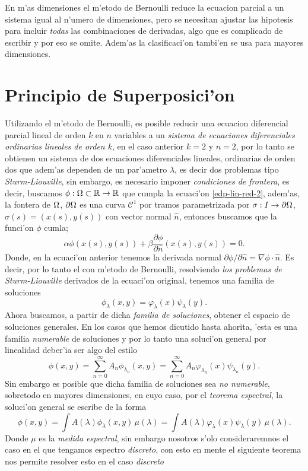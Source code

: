 \documentclass[main.tex]{subfiles}
\begin{document}
    \obs En m'as dimensiones el m'etodo de Bernoulli reduce la ecuacion parcial a un sistema igual al n'umero de dimensiones, pero se necesitan ajustar las hipotesis para incluir \emph{todas} las combinaciones de derivadas, algo que es complicado de escribir y por eso se omite. Adem'as la clasificaci'on tambi'en se usa para mayores dimensiones.
\section{Principio de Superposici'on}
\noindent Utilizando el m'etodo de Bernoulli, es posible reducir una ecuacion diferencial parcial lineal de orden $k$ en $n$ variables a un \emph{sistema de ecuaciones diferenciales ordinarias lineales de orden $k$}, en el caso anterior $k=2$ y $n=2$, por lo tanto se obtienen un sistema de dos ecuaciones diferenciales lineales, ordinarias de orden dos que adem'as dependen de un par'ametro $\lambda$, es decir dos problemas tipo \emph{Sturm-Liouville}, sin embargo, es necesario imponer \emph{condiciones de frontera}, es decir, buscamos $\phi:\Omega\subset\mathbb R \to\mathbb R $ que cumpla la ecuaci'on \ref{edp-lin-red-2}, adem'as, la fontera de $\Omega$, $\partial\Omega$ es una curva $\mathcal{C}^{1}$ por tramos parametrizada por $\sigma:I\to\partial\Omega$, $\sigma(s)=(x(s),y(s))$ con vector normal $\hat{n}$, entonces buscamos que la funci'on $\phi$ cumla;
\begin{equation}
  \alpha\phi(x(s),y(s))+\beta\dfrac{\partial\phi}{\partial \hat{n}}(x(s),y(s))=0.
\end{equation}
Donde, en la ecuaci'on anterior tenemos la derivada normal $\partial\phi/\partial\hat{n}=\nabla\phi\cdot\hat{n}$. Es decir, por lo tanto el con m'etodo de Bernoulli, resolviendo \emph{los problemas de Sturm-Liouville} derivados de la ecuaci'on original, tenemos una familia de soluciones
\[
  \phi_{\lambda}(x,y)=\varphi_{\lambda}(x)\psi_{\lambda}(y).
\]
Ahora buscamos, a partir de dicha \emph{familia de soluciones}, obtener el espacio de soluciones generales. En los casos que hemos dicutido hasta ahorita, 'esta es una familia \emph{numerable} de soluciones y por lo tanto una soluci'on general por linealidad deber'ia ser algo del estilo
\[
  \phi(x,y)=\sum_{n=0}^{\infty}A_{n}\phi_{\lambda_{n}}(x,y)=\sum_{n=0}^{\infty}A_{n}\varphi_{\lambda_{n}}(x)\psi_{\lambda_{n}}(y).
\]
Sin embargo es posible que dicha familia de soluciones sea \emph{no numerable}, sobretodo en mayores dimensiones, en cuyo caso, por el \emph{teorema espectral}, la soluci'on general se escribe de la forma
\[
  \phi(x,y)=\int A(\lambda)\phi_{\lambda}(x,y)\,\mu(\lambda)=\int A(\lambda)\varphi_{\lambda}(x)\psi_{\lambda}(y)\,\mu(\lambda).
\]
Donde $\mu$ es la \emph{medida espectral}, sin embargo nosotros s'olo consideraremnos el caso en el que tengamos espectro \emph{discreto}, con esto en mente el siguiente teorema nos permite resolver esto en el caso \emph{discreto}
\end{document}
